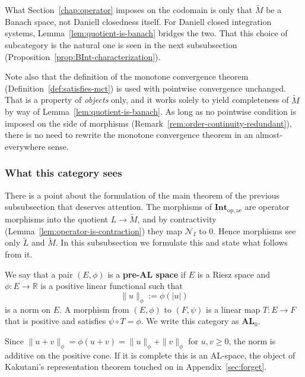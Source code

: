 \begin{remark}
  What Section~\ref{chap:operator} imposes on the codomain is only that
  $\widetilde{M}$ be a Banach space, not Daniell closedness itself.
  For Daniell closed integration systems,
  Lemma~\ref{lem:quotient-is-banach} bridges the two.
  That this choice of subcategory is the natural one is seen in the next
  subsubsection (Proposition~\ref{prop:BInt-characterization}).

  Note also that the definition of the monotone convergence theorem
  (Definition~\ref{def:satisfies-mct}) is used with pointwise convergence
  unchanged.
  That is a property of \emph{objects} only, and it works solely to yield
  completeness of $\widetilde{M}$ by way of
  Lemma~\ref{lem:quotient-is-banach}.
  As long as no pointwise condition is imposed on the side of morphisms
  (Remark~\ref{rem:order-continuity-redundant}), there is no need to rewrite the
  monotone convergence theorem in an almost-everywhere sense.
\end{remark}

\subsubsection{What this category sees}\label{sec:what-op-ae-sees}

There is a point about the formulation of the main theorem of the previous
subsubsection that deserves attention.
The morphisms of $\mathbf{Int}_{\mathrm{op},\mathrm{ae}}$ are operator morphisms
into the quotient $L\to\widetilde{M}$, and by contractivity
(Lemma~\ref{lem:operator-is-contraction}) they map $\mathcal{N}_I$ to $0$.
Hence morphisms see only $\widetilde{L}$ and $\widetilde{M}$.
In this subsubsection we formulate this and state what follows from it.

\begin{definition}\label{def:preAL}
  We say that a pair $(E,\phi)$ is a \textbf{pre-AL space} if $E$ is a Riesz
  space and $\phi:E\to\mathbb{R}$ is a positive linear functional such that
  \[
    \|u\|_\phi:=\phi(|u|)
  \]
  is a norm on $E$.
  A morphism from $(E,\phi)$ to $(F,\psi)$ is a linear map $T:E\to F$ that is
  positive and satisfies $\psi\circ T=\phi$.
  We write this category as $\mathbf{AL}_0$.
\end{definition}

\noindent
Since $\|u+v\|_\phi=\phi(u+v)=\|u\|_\phi+\|v\|_\phi$ for $u,v\ge0$, the norm is
additive on the positive cone.
If it is complete this is an AL-space, the object of Kakutani's representation
theorem touched on in Appendix~\ref{sec:forget}.

